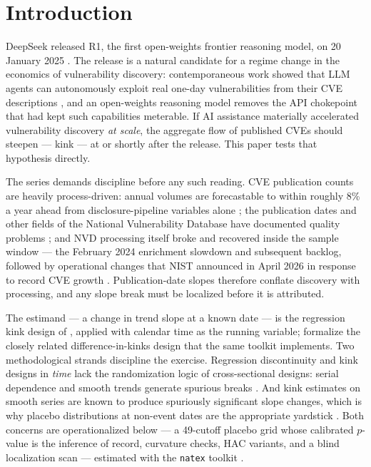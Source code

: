 \documentclass[11pt]{article}
\newcommand{\natex}{\texttt{natex}}
\begin{document}
\section{Introduction}\label{sec:intro}

DeepSeek released R1, the first open-weights frontier reasoning model, on 20
January 2025 \cite{deepseek2025}. The release is a natural candidate for a
regime change in the economics of vulnerability discovery: contemporaneous
work showed that LLM agents can autonomously exploit real one-day
vulnerabilities from their CVE descriptions \cite{fang2024}, and an
open-weights reasoning model removes the API chokepoint that had kept such
capabilities meterable. If AI assistance materially accelerated vulnerability
discovery \emph{at scale}, the aggregate flow of published CVEs should
steepen --- kink --- at or shortly after the release. This paper tests that
hypothesis directly.

The series demands discipline before any such reading. CVE publication
counts are heavily process-driven: annual volumes are forecastable to within
roughly 8\% a year ahead from disclosure-pipeline variables alone
\cite{leverett2022}; the publication dates and other fields of the National
Vulnerability Database have documented quality problems \cite{anwar2022};
and NVD processing itself broke and recovered inside the sample window ---
the February 2024 enrichment slowdown and subsequent backlog, followed by
operational changes that NIST announced in April 2026 in response to record
CVE growth \cite{nist2026}. Publication-date slopes therefore conflate
discovery with processing, and any slope break must be localized before it
is attributed.

The estimand --- a change in trend slope at a known date --- is the
regression kink design of \cite{card2015}, applied with calendar time as the
running variable; \cite{bockerman2025} formalize the closely related
difference-in-kinks design that the same toolkit implements. Two
methodological strands discipline the exercise. Regression discontinuity and
kink designs in \emph{time} lack the randomization logic of cross-sectional
designs: serial dependence and smooth trends generate spurious breaks
\cite{hausman2018}. And kink estimates on smooth series are known to produce
spuriously significant slope changes, which is why placebo distributions at
non-event dates are the appropriate yardstick \cite{ganong2018}. Both
concerns are operationalized below --- a 49-cutoff placebo grid whose
calibrated $p$-value is the inference of record, curvature checks, HAC
variants, and a blind localization scan --- estimated with the \natex{}
toolkit \cite{natex}.
\end{document}
